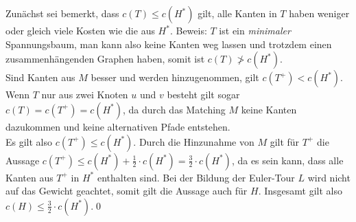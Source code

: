 \documentclass[a4paper]{article}
\begin{document}
	\maketitle
	\section{}
		Zunächst sei bemerkt, dass $c(T)\leq c(H^*)$ gilt, alle Kanten in $T$ haben weniger oder gleich viele Kosten wie die aus $H^*$.\n
		Beweis: $T$ ist ein \textit{minimaler} Spannungsbaum, man kann also keine Kanten weg lassen und trotzdem einen zusammenhängenden Graphen haben, somit ist $c(T)\not> c(H^*)$.\\
		Sind Kanten aus $M$ besser und werden hinzugenommen, gilt $c(T^+)<c(H^*)$.
		Wenn $T$ nur aus zwei Knoten $u$ und $v$ besteht gilt sogar $c(T)=c(T^+)=c(H^*)$, da durch das Matching $M$ keine Kanten dazukommen und keine alternativen Pfade entstehen.\\
		Es gilt also $c(T^+)\leq c(H^*)$.\n
		Durch die Hinzunahme von $M$ gilt für $T^+$ die Aussage $c(T^+)\leq c(H^*)+\frac{1}{2}\cdot c(H^*)=\frac{3}{2}\cdot c(H^*)$, da es sein kann, dass alle Kanten aus $T^+$ in $H^*$ enthalten sind.
		Bei der Bildung der Euler-Tour $L$ wird nicht auf das Gewicht geachtet, somit gilt die Aussage auch für $H$.\n
		Insgesamt gilt also $c(H)\leq \frac{3}{2}\cdot c(H^*)$.\qed
	\section{}
\end{document}
